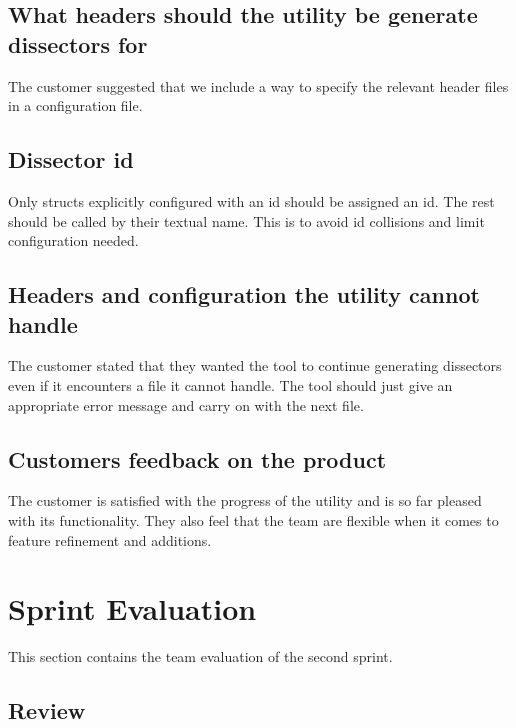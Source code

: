 \subsection*{What headers should the utility be generate dissectors for}
The customer suggested that we include a way to specify the relevant header files in a configuration file.

\subsection*{Dissector id}
Only structs explicitly configured with an id should be assigned an id. The rest should be called by their textual name. This is to avoid id collisions and limit configuration needed.

\subsection*{Headers and configuration the utility cannot handle}
The customer stated that they wanted the tool to continue generating dissectors even if it encounters a file it cannot handle. The tool should just give an appropriate error message and carry on with the next file.

\subsection{Customers feedback on the product}
The customer is satisfied with the progress of the utility and is so far pleased with its functionality. They also feel that the team are flexible when it comes to feature refinement and additions. 

\section{Sprint Evaluation}
This section contains the team evaluation of the second sprint.

\subsection{Review}



